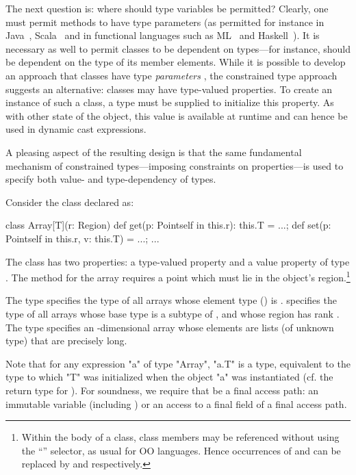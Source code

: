 The next question is: where should type variables be permitted?
Clearly, one must permit methods to have type parameters (as permitted
for instance in Java~\cite{Java3}, Scala~\cite{scala} and in
functional languages such as ML~\cite{ml} and Haskell~\cite{haskell}).
It is necessary as well to permit classes to be dependent on types---for
instance,  should be dependent on the type of its
member elements. While it is possible to develop an approach that
classes have type \emph{parameters} \cite{Java3}, the constrained
type approach suggests an alternative: classes may have type-valued
properties. To create an instance of such
a class, a type must be supplied to initialize this property. As with
other state of the object, this value is available at runtime and
can hence be used in dynamic cast expressions.

A pleasing aspect of the resulting design is that the same fundamental
mechanism of constrained types---imposing constraints on properties---is
used to specify both value- and type-dependency of types.

\begin{example}[Array]
  Consider the class  declared as:
{\footnotesize
\begin{xten}
class Array[T](r: Region) {
  def get(p: Point{self in this.r}): this.T = ...;
  def set(p: Point{self in this.r}, v: this.T) = ...;
  ...
}
\end{xten}}
{}\noindent The class has two properties: a type-valued property
 and a value property  of type .
The  method for the array requires a
point  which must lie in the object's region.\footnote{Within the body of
a class, class members may be referenced without using the
``'' selector, as usual for OO languages. Hence occurrences of
 and  can be replaced by  and
respectively.}
\end{example}

The type  specifies the type of all arrays
whose element type () is .
 
specifies the type of all arrays whose base
type is a subtype of , and whose region has rank
.
The type 
 
specifies an -dimensional array whose elements are lists (of
unknown type) that are precisely  long.

Note that for any expression \xcd"a" of type \xcd"Array", \xcd"a.T" is
a type, equivalent to the type to which \xcd"T" was initialized when
the object \xcd"a" was instantiated
(cf. the return type  for ).
For soundness, we require
that  be a final access path: an immutable
variable (including ) or an access to a final field of a final access
path.

